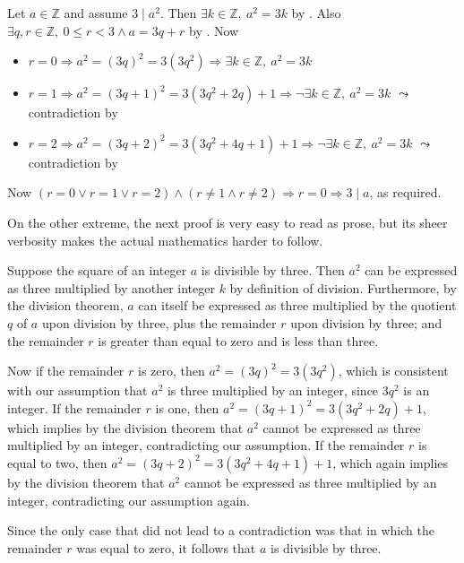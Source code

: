 \begin{extract}
\label{xtrThreeDividesSquareImpliesThreeDividesOriginalTooMuchNotation}
Let $a \in \mathbb{Z}$ and assume $3 \mid a^2$. Then $\exists k \in \mathbb{Z},~a^2=3k$ by . Also $\exists q, r \in \mathbb{Z},~ 0 \le r < 3 \wedge a = 3q+r$ by . Now
\begin{itemize}
\item $r=0 \Rightarrow a^2=(3q)^2=3(3q^2) \Rightarrow \exists k \in \mathbb{Z},~a^2=3k$ \TT
\item $r=1 \Rightarrow a^2=(3q+1)^2=3(3q^2+2q)+1 \Rightarrow \neg \exists k \in \mathbb{Z},~a^2=3k$ $\leadsto$ contradiction by 
\item $r=2 \Rightarrow a^2=(3q+2)^2=3(3q^2+4q+1)+1 \Rightarrow \neg \exists k \in \mathbb{Z},~a^2=3k$ $\leadsto$ contradiction by 
\end{itemize}
Now $(r=0 \vee r=1 \vee r=2) \wedge (r \ne 1 \wedge r \ne 2) \Rightarrow r=0 \Rightarrow 3 \mid a$, as required.
\end{extract}

On the other extreme, the next proof is very easy to read as prose, but its sheer verbosity makes the actual mathematics harder to follow.

\begin{extract}
\label{xtrThreeDividesSquareImpliesThreeDividesOriginalTooLittleNotation}
Suppose the square of an integer $a$ is divisible by three. Then $a^2$ can be expressed as three multiplied by another integer $k$ by definition of division. Furthermore, by the division theorem, $a$ can itself be expressed as three multiplied by the quotient $q$ of $a$ upon division by three, plus the remainder $r$ upon division by three; and the remainder $r$ is greater than equal to zero and is less than three.

Now if the remainder $r$ is zero, then $a^2=(3q)^2=3(3q^2)$, which is consistent with our assumption that $a^2$ is three multiplied by an integer, since $3q^2$ is an integer. If the remainder $r$ is one, then $a^2=(3q+1)^2=3(3q^2+2q)+1$, which implies by the division theorem that $a^2$ cannot be expressed as three multiplied by an integer, contradicting our assumption. If the remainder $r$ is equal to two, then $a^2=(3q+2)^2=3(3q^2+4q+1)+1$, which again implies by the division theorem that $a^2$ cannot be expressed as three multiplied by an integer, contradicting our assumption again.

Since the only case that did not lead to a contradiction was that in which the remainder $r$ was equal to zero, it follows that $a$ is divisible by three.
\end{extract}

